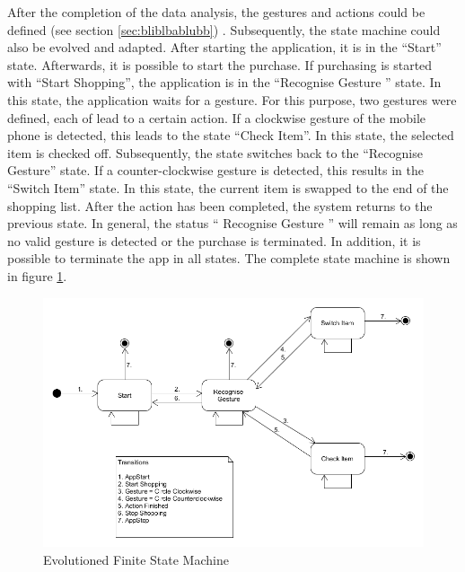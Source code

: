 After the completion of the data analysis, the gestures and actions could be
defined (see section \ref{sec:bliblbablubb}) \textbf{\color{red}{TODO: Kapitle
vom Markus referenzieren}}. Subsequently, the state machine could also be
evolved and adapted. After starting the application, it is in the ``Start''
state. Afterwards, it is possible to start the purchase. If purchasing is
started with ``Start Shopping'', the application is in the ``Recognise
Gesture '' state. In this state, the application waits for a gesture. For this
purpose, two gestures were defined, each of lead to a certain action. If a
clockwise gesture of the mobile phone is detected, this leads to the state
``Check Item''. In this state, the selected item is checked off. Subsequently,
the state switches back to the ``Recognise Gesture'' state. If a
counter-clockwise gesture is detected, this results in the ``Switch Item''
state. In this state, the current item is swapped to the end of the shopping
list. After the action has been completed, the system returns to the previous
state. In general, the status `` Recognise Gesture '' will remain as long as no
valid gesture is detected or the purchase is terminated. In addition, it is
possible to terminate the app in all states. The complete state machine is shown
in figure \ref{fig:evo state machine}.

\begin{figure}
\centering
\captionsetup{justification=centering}
\includegraphics[width=\textwidth]{res/sa/PresentationStateMachineNew.png}
\caption{Evolutioned Finite State Machine}
\label{fig:evo state machine}
\end{figure}

